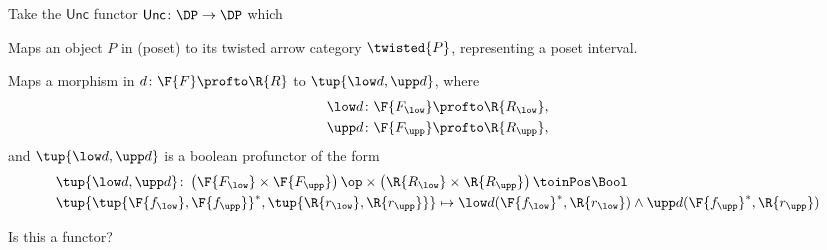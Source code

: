 Take the $\mathsf{Unc}$ functor $\mathsf{Unc}\colon \DP\to \DP$ which
\begin{compactenum}
  \item Maps an object $P$ in \DP (poset) to its twisted arrow category $\twisted{P}$, representing a poset interval.
  \item Maps a morphism in \DP $d\colon \F{F}\profto \R{R}$ to $\tup{\low d,\upp d}$, where
  \begin{equation}
    \begin{aligned}
      \low d\colon \F{F_{\low}}&\profto \R{R_{\low}},\\
      \upp d\colon \F{F_{\upp}}&\profto \R{R_{\upp}},
    \end{aligned}
  \end{equation}
  and $\tup{\low d,\upp d}$ is a boolean profunctor of the form
  \begin{equation}
    \begin{aligned}
      &\tup{\low d,\upp d}\colon \left(\F{F_{\low}}\times \F{F_{\upp}} \right)\op \times \left(\R{R_{\low}}\times \R{R_{\upp}} \right)\toinPos \Bool\\
      &\tup{\tup{\F{f_{\low}},\F{f_{\upp}}}^*,\tup{\R{r_{\low}},\R{r_{\upp}}}}\mapsto \low d(\F{f_{\low}}^*,\R{r_{\low}})\wedge \upp d(\F{f_{\upp}}^*,\R{r_{\upp}})
    \end{aligned}
  \end{equation}
\end{compactenum}

Is this a functor?

